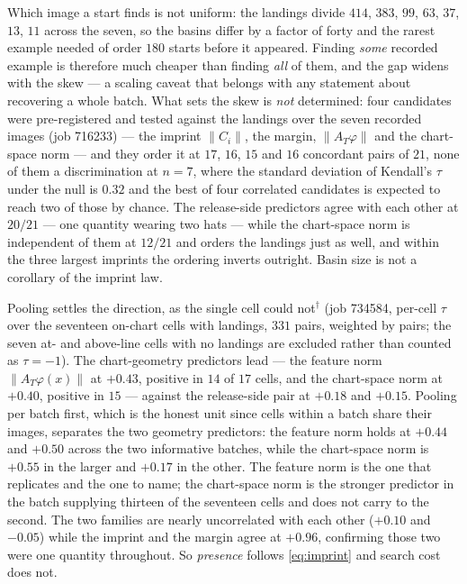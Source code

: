 Which image a start finds is not uniform: the landings divide $414$, $383$,
$99$, $63$, $37$, $13$, $11$ across the seven, so the basins differ by a factor
of forty and the rarest example needed of order $180$ starts before it appeared.
Finding \emph{some} recorded example is therefore much cheaper than finding
\emph{all} of them, and the gap widens with the skew --- a scaling caveat that
belongs with any statement about recovering a whole batch. What sets the skew
is \emph{not} determined: four candidates were pre-registered and tested
against the landings over the seven recorded images (job 716233) --- the
imprint $\|C_i\|$, the margin, $\|A_T\varphi\|$ and the chart-space norm ---
and they order it at $17$, $16$, $15$ and $16$ concordant pairs of $21$, none
of them a discrimination at $n=7$, where the standard deviation of Kendall's
$\tau$ under the null is $0.32$ and the best of four correlated candidates is
expected to reach two of those by chance. The release-side predictors agree
with each other at $20/21$ --- one quantity wearing two hats --- while the
chart-space norm is independent of them at $12/21$ and orders the landings
just as well, and within the three largest imprints the ordering inverts
outright. Basin size is not a corollary of the
imprint law.

Pooling settles the direction, as the single cell could not$^\dagger$ (job
734584, per-cell $\tau$ over the seventeen on-chart cells with landings, $331$
pairs, weighted by pairs; the seven at- and above-line cells with no landings
are excluded rather than counted as $\tau=-1$). The chart-geometry
predictors lead --- the feature norm $\|A_T\varphi(x)\|$ at $+0.43$, positive
in $14$ of $17$ cells, and the chart-space norm at $+0.40$, positive in $15$
--- against the release-side pair at $+0.18$ and $+0.15$. Pooling per batch
first, which is the honest unit since cells within a batch share their images,
separates the two geometry predictors: the feature norm holds at $+0.44$ and
$+0.50$ across the two informative batches, while the chart-space norm is
$+0.55$ in the larger and $+0.17$ in the other. The feature norm is the one
that replicates and the one to name; the chart-space norm is the stronger
predictor in the batch supplying thirteen of the seventeen cells and does not
carry to the second. The two families are
nearly uncorrelated with each other ($+0.10$ and $-0.05$) while the imprint
and the margin agree at $+0.96$, confirming those two were one quantity
throughout. So \emph{presence} follows \eqref{eq:imprint} and search cost does not.

